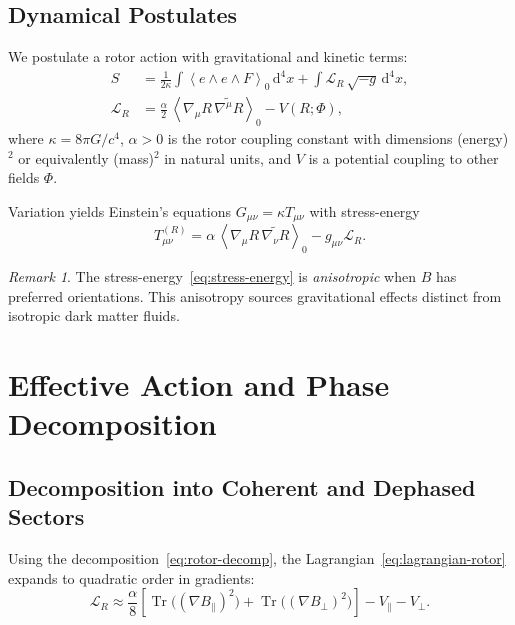 \documentclass[11pt,a4paper]{article}
\numberwithin{equation}{section}
\theoremstyle{plain}
\theoremstyle{definition}
\theoremstyle{remark}
\newtheorem{remark}[theorem]{Remark}
\DeclareMathOperator{\Tr}{Tr}
\newcommand{\dd}{\mathrm{d}}
\newcommand{\rev}[1]{\widetilde{#1}}        %
\newcommand{\grade}[2]{\left\langle #1 \right\rangle_{#2}}
\newcommand{\Lag}{\mathcal{L}}              %
\begin{document}
\subsection{Dynamical Postulates}

We postulate a rotor action with gravitational and kinetic terms:
\begin{align}
S &= \frac{1}{2\kappa}\int \grade{e\wedge e\wedge F}{0}\,\dd^4x
    + \int \Lag_R\,\sqrt{-g}\,\dd^4x,
\label{eq:action}\\
\Lag_R &= \frac{\alpha}{2}\,\grade{\nabla_\mu R\,\rev{\nabla^\mu R}}{0}-V(R;\Phi),
\label{eq:lagrangian-rotor}
\end{align}
where $\kappa=8\pi G/c^4$, $\alpha>0$ is the rotor coupling constant with dimensions (energy)$^2$ or equivalently (mass)$^2$ in natural units, and $V$ is a potential coupling to other fields $\Phi$.

Variation yields Einstein's equations $G_{\mu\nu}=\kappa T_{\mu\nu}$ with stress-energy
\begin{equation}
T^{(R)}_{\mu\nu}=\alpha\,\grade{\nabla_\mu R\,\rev{\nabla_\nu R}}{0}-g_{\mu\nu}\Lag_R.
\label{eq:stress-energy}
\end{equation}

\begin{remark}
The stress-energy~\eqref{eq:stress-energy} is \emph{anisotropic} when $B$ has preferred orientations. This anisotropy sources gravitational effects distinct from isotropic dark matter fluids.
\end{remark}

\vspace{1em}

\section{Effective Action and Phase Decomposition}\label{sec:action}

\subsection{Decomposition into Coherent and Dephased Sectors}

Using the decomposition~\eqref{eq:rotor-decomp}, the Lagrangian~\eqref{eq:lagrangian-rotor} expands to quadratic order in gradients:
\begin{equation}
\Lag_R \approx \frac{\alpha}{8}\left[\Tr\big((\nabla B_\parallel)^2\big)+\Tr\big((\nabla B_\perp)^2\big)\right]-V_\parallel - V_\perp.
\end{equation}
\end{document}
